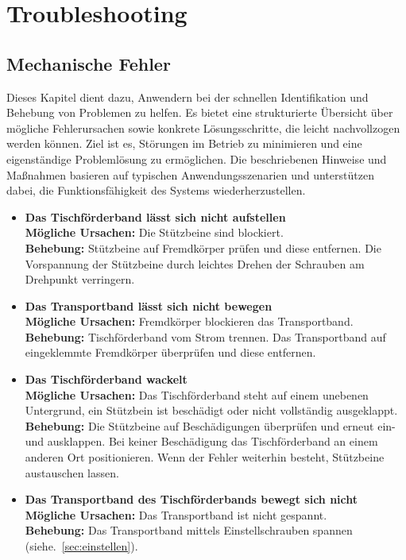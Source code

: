 %
%

\chapter{Troubleshooting}
\section{Mechanische Fehler} 
Dieses Kapitel dient dazu, Anwendern bei der schnellen Identifikation und Behebung von Problemen zu helfen. Es bietet eine strukturierte Übersicht über mögliche Fehlerursachen sowie konkrete Lösungsschritte, die leicht nachvollzogen werden können. Ziel ist es, Störungen im Betrieb zu minimieren und eine eigenständige Problemlösung zu ermöglichen. Die beschriebenen Hinweise und Maßnahmen basieren auf typischen Anwendungsszenarien und unterstützen dabei, die Funktionsfähigkeit des Systems wiederherzustellen.
\begin{itemize}
	\item \textbf{Das Tischförderband lässt sich nicht aufstellen} \\
	\textbf{Mögliche Ursachen:} Die Stützbeine sind blockiert. \\
	\textbf{Behebung:} Stützbeine auf Fremdkörper prüfen und diese entfernen. Die Vorspannung der Stützbeine durch leichtes Drehen der Schrauben am Drehpunkt verringern.
	
	\item \textbf{Das Transportband lässt sich nicht bewegen} \\
	\textbf{Mögliche Ursachen:} Fremdkörper blockieren das Transportband. \\
	\textbf{Behebung:} Tischförderband vom Strom trennen. Das Transportband auf eingeklemmte Fremdkörper überprüfen und diese entfernen. 
	
	\item \textbf{Das Tischförderband wackelt} \\ 
	\textbf{Mögliche Ursachen:} Das Tischförderband steht auf einem unebenen Untergrund, ein Stützbein ist beschädigt oder nicht vollständig ausgeklappt. \\ 
	\textbf{Behebung:} Die Stützbeine auf Beschädigungen überprüfen und erneut ein- und ausklappen. Bei keiner Beschädigung das Tischförderband an einem anderen Ort positionieren. Wenn der Fehler weiterhin besteht, Stützbeine austauschen lassen.
	
	\item \textbf{Das Transportband des Tischförderbands bewegt sich nicht} \\ 
	\textbf{Mögliche Ursachen:} Das Transportband ist nicht gespannt. \\ 
	\textbf{Behebung:} Das Transportband mittels Einstellschrauben spannen (siehe.~\ref{sec:einstellen}). 
	
\end{itemize}

